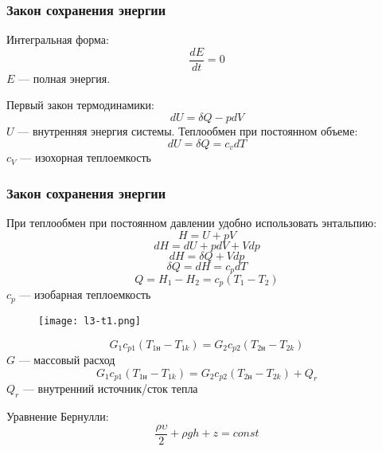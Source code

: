 \begin{frame}
\frametitle{Закон сохранения энергии}
Интегральная форма:
\begin{equation}
 \dfrac{d E} {d t} =0
\end{equation}
$E$ --- полная энергия.

Первый закон термодинамики:
\begin{equation}
	d U = \delta Q -p dV
\end{equation}
$U $ --- внутренняя энергия системы.
Теплообмен при постоянном объеме:
\begin{equation}
	d U = \delta Q = c_v dT
\end{equation}
$c_V$ --- изохорная теплоемкость

\end{frame}

\begin{frame}
\frametitle{Закон сохранения энергии}
При теплообмен при постоянном давлении удобно использовать энтальпию:
\begin{equation*}
	H =U +pV
\end{equation*}
\begin{equation*}
	d H = d U +p d V +V d p
\end{equation*}
\begin{equation*}
	d H = \delta Q +V d p
\end{equation*}
\begin{equation*}
	\delta Q = d H = c_p dT
\end{equation*}
\begin{equation*}
  Q = H_1 - H_2 = c_p (T_1 - T_2)
\end{equation*}
$c_p$ --- изобарная теплоемкость

\end{frame}

\begin{frame}
	\begin{figure}[h]
		\texttt{[image: l3-t1.png]}
	\end{figure}	
	
	\begin{equation*}
		G_1 c_{p1}(T_{1н}-T_{1k})=G_2 c_{p2}(T_{2н}-T_{2k})
	\end{equation*}
	$G$ --- массовый расход
	\begin{equation*}
	G_1 c_{p1}(T_{1н}-T_{1k})=G_2 c_{p2}(T_{2н}-T_{2k})+Q_r
	\end{equation*}
	$Q_r$ --- внутренний источник/сток тепла
	
	Уравнение Бернулли:
	\begin{equation*}
		\dfrac{\rho \upsilon}{2} + \rho g h + z = const
	\end{equation*}
\end{frame}

